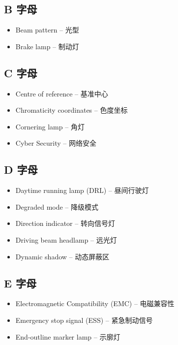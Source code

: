\subsection{B 字母}

\begin{itemize}[leftmargin=2em]
    \item Beam pattern -- 光型
    \item Brake lamp -- 制动灯
\end{itemize}

\subsection{C 字母}

\begin{itemize}[leftmargin=2em]
    \item Centre of reference -- 基准中心
    \item Chromaticity coordinates -- 色度坐标
    \item Cornering lamp -- 角灯
    \item Cyber Security -- 网络安全
\end{itemize}

\subsection{D 字母}

\begin{itemize}[leftmargin=2em]
    \item Daytime running lamp (DRL) -- 昼间行驶灯
    \item Degraded mode -- 降级模式
    \item Direction indicator -- 转向信号灯
    \item Driving beam headlamp -- 远光灯
    \item Dynamic shadow -- 动态屏蔽区
\end{itemize}

\subsection{E 字母}

\begin{itemize}[leftmargin=2em]
    \item Electromagnetic Compatibility (EMC) -- 电磁兼容性
    \item Emergency stop signal (ESS) -- 紧急制动信号
    \item End-outline marker lamp -- 示廓灯
\end{itemize}

